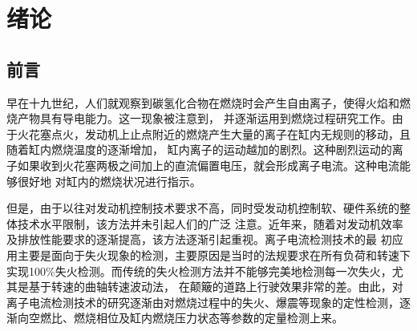 \chapter{绪论}
\section{前言}
早在十九世纪，人们就观察到碳氢化合物在燃烧时会产生自由离子，使得火焰和燃烧产物具有导电能力。这一现象被注意到，
并逐渐运用到燃烧过程研究工作。由于火花塞点火，发动机上止点附近的燃烧产生大量的离子在缸内无规则的移动，且随着缸内燃烧温度的逐渐增加，
缸内离子的运动越加的剧烈。这种剧烈运动的离子如果收到火花塞两极之间加上的直流偏置电压，就会形成离子电流。这种电流能够很好地
对缸内的燃烧状况进行指示\cite{xjgxcs}。\par
但是，由于以往对发动机控制技术要求不高，同时受发动机控制软、硬件系统的整体技术水平限制，该方法并未引起人们的广泛
注意。近年来，随着对发动机效率及排放性能要求的逐渐提高，该方法逐渐引起重视。离子电流检测技术的最
初应用主要是面向于失火现象的检测，主要原因是当时的法规要求在所有负荷和转速下实现100\%失火检测\cite{grzys}。而传统的失火检测方法并不能够完美地检测每一次失火，尤其是基于转速的曲轴转速波动法，
在颠簸的道路上行驶效果非常的差。由此，对离子电流检测技术的研究逐渐由对燃烧过程中的失火、爆震等现象的定性检测，逐渐向空燃比、燃烧相位及缸内燃烧压力状态等参数的定量检测上来。
